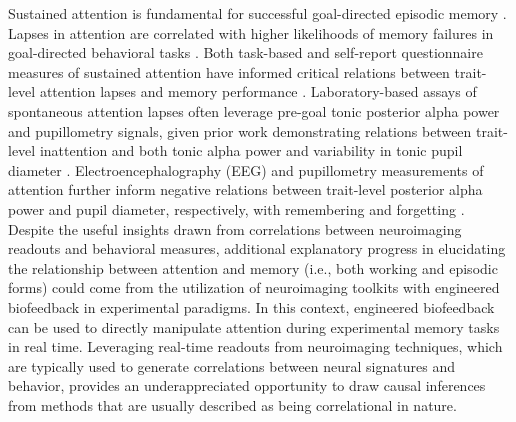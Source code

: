 Sustained attention is fundamental for successful goal-directed episodic memory \parencite{baddeley1984attention,craik1996effects,anderson1995status,evans2019preretrieval,curran2004effects}. Lapses in attention are correlated with higher likelihoods of memory failures in goal-directed behavioral tasks \parencite{madore2020memory}. Both task-based \parencite{esterman2013zone,rosenberg2013sustaining} and self-report questionnaire \parencite{ophir2009cognitive,ralph2014media,kessler2005world,patton1995factor,green2007action,carriere2008everyday,carriere2013wandering} measures of sustained attention have informed critical relations between trait-level attention lapses and memory performance \parencite{madore2020memory}. Laboratory-based assays of spontaneous attention lapses often leverage pre-goal tonic posterior alpha power and pupillometry signals, given prior work demonstrating relations between trait-level inattention and both tonic alpha power and variability in tonic pupil diameter \parencite{unsworth2017importance,klimesch2012alpha}. Electroencephalography (EEG) and pupillometry measurements of attention \parencite{macdonald2011trial,unsworth2018tracking} further inform negative relations between trait-level posterior alpha power and pupil diameter, respectively, with remembering and forgetting \parencite{madore2020memory}. Despite the useful insights drawn from correlations between neuroimaging readouts and behavioral measures, additional explanatory progress in elucidating the relationship between attention and memory (i.e., both working and episodic forms) could come from the utilization of neuroimaging toolkits with engineered biofeedback in experimental paradigms. In this context, engineered biofeedback can be used to directly manipulate attention during experimental memory tasks in real time. Leveraging real-time readouts from neuroimaging techniques, which are typically used to generate correlations between neural signatures and behavior, provides an underappreciated opportunity to draw causal inferences from methods that are usually described as being correlational in nature.

